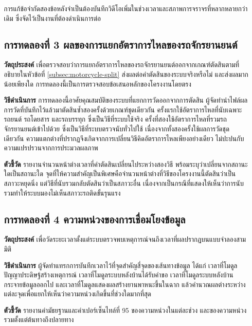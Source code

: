 การแก้ข้อจำกัดสองข้อหลังจำเป็นต้องบันทึกวิดีโอเพิ่มในช่วงเวลาและสภาพการจราจรที่หลากหลายกว่าเดิม ซึ่งจัดไว้เป็นงานที่ต้องดำเนินการต่อ

\subsection{การทดลองที่ 3 ผลของการแยกอัตราการไหลของรถจักรยานยนต์}
\label{subsec:exp-ablation}

\textbf{วัตถุประสงค์} เพื่อตรวจสอบว่าการแยกอัตราการไหลของรถจักรยานยนต์ออกจากเกณฑ์ตัดสินตามที่อธิบายในหัวข้อที่ \ref{subsec:motorcycle-split} ส่งผลต่อคำตัดสินของระบบจริงหรือไม่ และส่งผลมากน้อยเพียงใด  การทดลองนี้เป็นการตรวจสอบข้อเสนอหลักของโครงงานโดยตรง

\textbf{วิธีดำเนินการ} การทดลองนี้อาศัยคุณสมบัติของระบบที่แยกการวัดออกจากการตัดสิน ผู้จัดทำนำไฟล์ผลการวัดที่บันทึกไว้แล้วมาตัดสินซ้ำสองครั้งด้วยเกณฑ์ชุดเดียวกัน  ครั้งแรกใช้อัตราการไหลที่นับเฉพาะรถยนต์ รถโดยสาร และรถบรรทุก ซึ่งเป็นวิธีที่ระบบใช้จริง  ครั้งที่สองใช้อัตราการไหลที่รวมรถจักรยานยนต์เข้าไปด้วย ซึ่งเป็นวิธีที่ระบบตรวจนับทั่วไปใช้  เนื่องจากทั้งสองครั้งใช้ผลการวัดชุดเดียวกัน ความแตกต่างที่ปรากฏจึงเกิดจากการเปลี่ยนวิธีคิดอัตราการไหลเพียงอย่างเดียว ไม่ปะปนกับความแปรปรวนจากการประมวลผลภาพ

\textbf{ตัวชี้วัด} รายงานจำนวนหน้าต่างเวลาที่คำตัดสินเปลี่ยนไประหว่างสองวิธี พร้อมระบุว่าเปลี่ยนจากสถานะใดเป็นสถานะใด  จุดที่ให้ความสำคัญเป็นพิเศษคือจำนวนหน้าต่างที่วิธีของโครงงานนี้ตัดสินว่าเป็นสภาวะหยุดนิ่ง แต่วิธีที่นับรวมกลับตัดสินว่าเป็นสภาวะอื่น เนื่องจากเป็นกรณีที่แสดงให้เห็นว่าการนับรวมทำให้ระบบมองไม่เห็นสภาวะรถติดขั้นรุนแรง

\subsection{การทดลองที่ 4 ความหน่วงของการเชื่อมโยงข้อมูล}
\label{subsec:exp-latency}

\textbf{วัตถุประสงค์} เพื่อวัดระยะเวลาตั้งแต่ระบบตรวจพบเหตุการณ์จนถึงเวลาที่ผลปรากฏบนแบบจำลองสามมิติ

\textbf{วิธีดำเนินการ} ผู้จัดทำแทรกการบันทึกเวลาไว้ที่จุดสำคัญสี่จุดของเส้นทางข้อมูล ได้แก่ เวลาที่โมดูลปัญญาประดิษฐ์สร้างเหตุการณ์ เวลาที่โมดูลระบบหลังบ้านได้รับคำขอ เวลาที่โมดูลระบบหลังบ้านกระจายข้อมูลออกไป และเวลาที่โมดูลแสดงผลสร้างยานพาหนะขึ้นในฉาก แล้วคำนวณผลต่างระหว่างแต่ละจุดเพื่อแยกให้เห็นว่าความหน่วงเกิดขึ้นที่ช่วงใดมากที่สุด

\textbf{ตัวชี้วัด} รายงานค่ามัธยฐานและค่าเปอร์เซ็นไทล์ที่ 95 ของความหน่วงในแต่ละช่วง และของความหน่วงรวมตั้งแต่ต้นทางถึงปลายทาง

